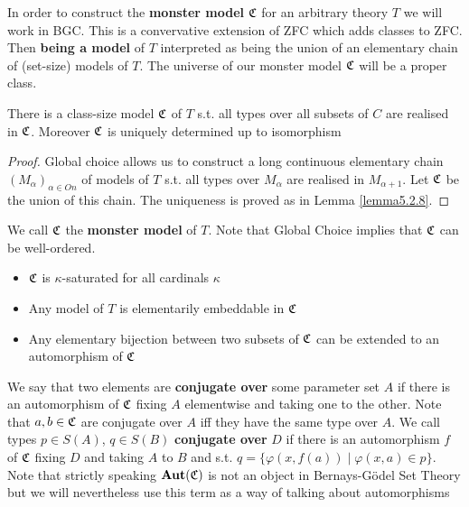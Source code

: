 \documentclass[11pt]{article}
\begin{document}
In order to construct the \textbf{monster model} \(\mathfrak{C}\) for an arbitrary theory \(T\) we will work in BGC.
This is a convervative extension of ZFC which adds classes to ZFC. Then \textbf{being a model} of \(T\)
interpreted as being the union of an elementary chain of (set-size) models of \(T\). The universe
of our monster model \(\mathfrak{C}\) will be a proper class.

\begin{theorem}[BGC]
There is a class-size model \(\mathfrak{C}\) of \(T\) s.t. all types over all subsets of \(C\) are realised
in \(\mathfrak{C}\). Moreover \(\mathfrak{C}\) is uniquely determined up to isomorphism
\end{theorem}

\begin{proof}
Global choice allows us to construct a long continuous elementary chain \((M_\alpha)_{\alpha\in On}\) of
models of \(T\) s.t. all types over \(M_\alpha\) are realised in \(M_{\alpha+1}\). Let \(\mathfrak{C}\) be the union
of this chain. The uniqueness is proved as in Lemma \ref{lemma5.2.8}.
\end{proof}

We call \(\mathfrak{C}\) the \textbf{monster model} of \(T\). Note that Global Choice implies that \(\mathfrak{C}\) can be
well-ordered.

\begin{corollary}[]
\begin{itemize}
\item \(\mathfrak{C}\) is \(\kappa\)-saturated for all cardinals \(\kappa\)
\item Any model of \(T\) is elementarily embeddable in \(\mathfrak{C}\)
\item Any elementary bijection between two subsets of \(\mathfrak{C}\) can be extended to an automorphism of \(\mathfrak{C}\)
\end{itemize}
\end{corollary}

We say that two elements are \textbf{conjugate over} some parameter set \(A\) if there is an automorphism
of \(\mathfrak{C}\) fixing \(A\) elementwise and taking one to the other. Note that \(a,b\in\mathfrak{C}\) are conjugate
over \(A\) iff they have the same type over \(A\). We call types \(p\in S(A)\), \(q\in S(B)\)
\textbf{conjugate over} \(D\) if there is an automorphism \(f\) of \(\mathfrak{C}\) fixing \(D\) and taking \(A\)
to \(B\) and s.t. \(q=\{\varphi(x,f(a))\mid \varphi(x,a)\in p\}\). Note that strictly speaking \(\operatorname{\textbf{Aut}}(\mathfrak{C})\) is not
an object in Bernays-Gödel Set Theory but we will nevertheless use this term as a way of talking
about automorphisms
\end{document}
